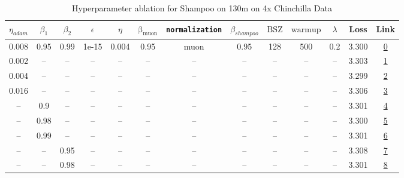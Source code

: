 \begin{table}[H]
\centering
\caption{Hyperparameter ablation for Shampoo on 130m on 4x Chinchilla Data}
\label{tab:ablation_shampoo_130m_4}
\begin{tabular}{ccccccccccccc}
\toprule
$\eta_{adam}$ & $\beta_1$ & $\beta_2$ & $\epsilon$ & $\eta$ & $\mathrm{\beta_{muon}}$ & \texttt{normalization} & $\beta_{shampoo}$ & $\mathrm{BSZ}$ & $\mathrm{warmup}$ & $\lambda$ & Loss & Link \\
\midrule
0.008 & 0.95 & 0.99 & 1e-15 & 0.004 & 0.95 & muon & 0.95 & 128 & 500 & 0.2 & 3.300 & \href{https://wandb.ai/stanford-mercury/optimizer-scaling/runs/sweep-130m-10B-mudamhcf2e65lr0.004-alr0.008-wd0.2-minlr0-warmup5-8614e7}{0} \\
\midrule
0.002 & -- & -- & -- & -- & -- & -- & -- & -- & -- & -- & 3.303 & \href{https://wandb.ai/stanford-mercury/optimizer-scaling/runs/sweep-130m-10B-mudamhf80736lr0.004-alr0.002-wd0.2-minlr0-warmup5-19fa6b}{1} \\
0.004 & -- & -- & -- & -- & -- & -- & -- & -- & -- & -- & 3.299 & \href{https://wandb.ai/stanford-mercury/optimizer-scaling/runs/sweep-130m-10B-mudamha5bf40lr0.004-alr0.004-wd0.2-minlr0-warmup5-cf5259}{2} \\
0.016 & -- & -- & -- & -- & -- & -- & -- & -- & -- & -- & 3.306 & \href{https://wandb.ai/stanford-mercury/optimizer-scaling/runs/sweep-130m-10B-mudamhe8a62alr0.004-alr0.016-wd0.2-minlr0-warmup5-4635fb}{3} \\
-- & 0.9 & -- & -- & -- & -- & -- & -- & -- & -- & -- & 3.301 & \href{https://wandb.ai/stanford-mercury/optimizer-scaling/runs/sweep-130m-10B-mudamh2078c7lr0.004-alr0.008-wd0.2-minlr0-warmup5-7d345f}{4} \\
-- & 0.98 & -- & -- & -- & -- & -- & -- & -- & -- & -- & 3.300 & \href{https://wandb.ai/stanford-mercury/optimizer-scaling/runs/sweep-130m-10B-mudamha5a170lr0.004-alr0.008-wd0.2-minlr0-warmup5-e1af40}{5} \\
-- & 0.99 & -- & -- & -- & -- & -- & -- & -- & -- & -- & 3.301 & \href{https://wandb.ai/stanford-mercury/optimizer-scaling/runs/sweep-130m-10B-mudamhb1b884lr0.004-alr0.008-wd0.2-minlr0-warmup5-54e72d}{6} \\
-- & -- & 0.95 & -- & -- & -- & -- & -- & -- & -- & -- & 3.308 & \href{https://wandb.ai/stanford-mercury/optimizer-scaling/runs/sweep-130m-10B-mudamhecb30dlr0.004-alr0.008-wd0.2-minlr0-warmup5-0e41b1}{7} \\
-- & -- & 0.98 & -- & -- & -- & -- & -- & -- & -- & -- & 3.301 & \href{https://wandb.ai/stanford-mercury/optimizer-scaling/runs/sweep-130m-10B-mudamha980a6lr0.004-alr0.008-wd0.2-minlr0-warmup5-2c58d4}{8} \\

\end{tabular}
\end{table}

